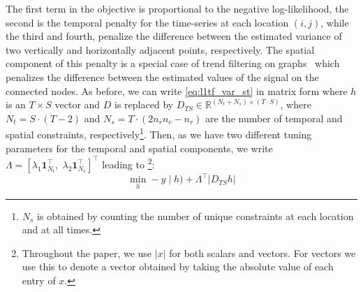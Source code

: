 \documentclass{article}
\newcommand{\attn}[1]{\textcolor{red}{TODO: #1}}
\newcommand{\one}{\mathbf{1}}
\newcommand{\given}{\;\vert\;}
\begin{document}
The first term in the objective is proportional to the negative
log-likelihood, the second is the temporal penalty for the
time-series at each location $(i,j)$, while the third and fourth,
penalize the difference between the estimated variance of two
vertically and horizontally adjacent points, respectively. The spatial
component of this
penalty is a special case of trend
filtering on graphs~\citep{wang_trend_2016} which penalizes the difference
between the estimated values of the signal on the connected
nodes. As before, we can write
\eqref{eq:l1tf_var_st} in matrix form where $h$ is an $T\times
S$ vector and $D$ is replaced by $D_{TS} \in \mathbb{R}^{(N_t+N_s) \times (T \cdot S)	}$, where $N_t=S \cdot (T-2)$ and $N_s=T \cdot (2n_rn_c-n_r)$ are the number of temporal and spatial constraints, respectively\footnote{$N_s$ is obtained by counting the number of unique constraints at each location and at all times.}. Then, as we
have two different tuning parameters for the temporal and spatial
components, we write $\Lambda =\left[\lambda_1\one_{N_t}^\top,\;
  \lambda_2\one_{N_s}^\top\right]^\top$ leading to \footnote{Throughout the paper, we use $|x|$ for both scalars and vectors. For vectors we use this to denote a vector obtained by taking the absolute value of each entry of $x$.}:
\begin{equation}
\min_h -y\given h)+ \Lambda^\top | D_{TS}h |
\label{eq:l1tf_var_st_mat}
\end{equation}
\end{document}
